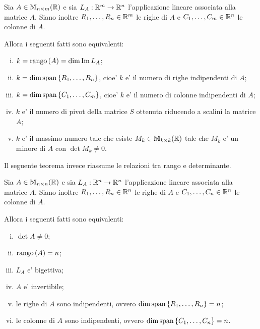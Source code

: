 \begin{theorem}\label{equivalenza_definizioni_di_rango}
    Sia $A \in \mathbb{M}_{n \times m}(\mathbb{R})$ e sia $L_A : \mathbb{R}^m \to \mathbb{R}^n$ l'applicazione lineare associata alla matrice $A$. Siano inoltre $R_1, \dots, R_n \in \mathbb{R}^m$ le righe di $A$ e $C_1, \dots, C_m \in \mathbb{R}^n$ le colonne di $A$. 
    
    Allora i seguenti fatti sono equivalenti:
    \begin{enumerate}
        [(i)]
        \item $k = \operatorname{rango}\left( A \right) = \dim \operatorname{Im}L_A$;
        \item $k = \dim \operatorname{span}\left\{R_1, \dots, R_n\right\}$, cioe' $k$ e' il numero di righe indipendenti di $A$;
        \item $k = \dim \operatorname{span}\left\{C_1, \dots, C_m\right\}$, cioe' $k$ e' il numero di colonne indipendenti di $A$;
        \item $k$ e' il numero di pivot della matrice $S$ ottenuta riducendo a scalini la matrice $A$;
        \item $k$ e' il massimo numero tale che esiste $M_k \in \mathbb{M}_{k \times k}(\mathbb{R})$ tale che $M_k$ e' un minore di $A$ con $\det M_k \neq 0$.
    \end{enumerate}
\end{theorem}

Il seguente teorema invece riassume le relazioni tra rango e determinante.

\begin{theorem}\label{relazioni_determinante_rango}
    Sia $A \in \mathbb{M}_{n \times n}(\mathbb{R})$ e sia $L_A : \mathbb{R}^n \to \mathbb{R}^n$ l'applicazione lineare associata alla matrice $A$. Siano inoltre $R_1, \dots, R_n \in \mathbb{R}^n$ le righe di $A$ e $C_1, \dots, C_n \in \mathbb{R}^n$ le colonne di $A$. 
    
    Allora i seguenti fatti sono equivalenti:
    \begin{enumerate}
        [(i)]
        \item $\det A \neq 0$;
        \item $\operatorname{rango}\left( A \right) = n$;
        \item $L_A$ e' bigettiva;
        \item $A$ e' invertibile;
        \item le righe di $A$ sono indipendenti, ovvero $\dim \operatorname{span}\left\{R_1, \dots, R_n\right\} = n$;
        \item le colonne di $A$ sono indipendenti, ovvero $\dim \operatorname{span}\left\{C_1, \dots, C_n\right\} = n$.
    \end{enumerate}
\end{theorem}